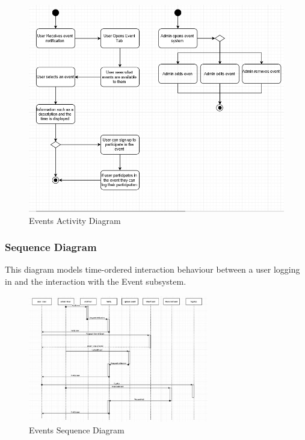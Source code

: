 \begin{figure}[H]
		\centering
		\includegraphics[width=\textwidth]{event/ActivityDiagramTask2.PNG}
		\caption{Events Activity Diagram}
\end{figure}


\subsubsection{Sequence Diagram}
This diagram models time-ordered interaction behaviour between a user logging in and the interaction with the Event subsystem.
\begin{figure}[H]
		\centering
		\includegraphics[width=0.7\textwidth]{event/SequenceDiagramTask2.PNG}
		\caption{Events Sequence Diagram}
\end{figure}



